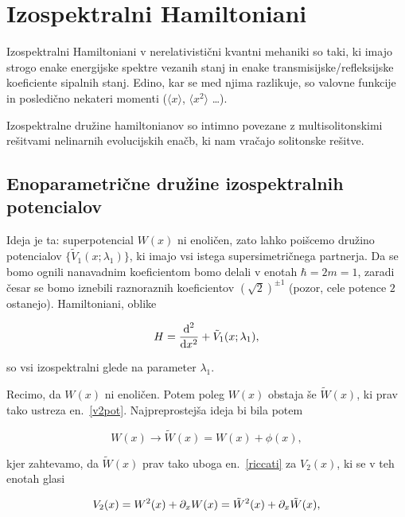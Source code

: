 \section{Izospektralni Hamiltoniani}

Izospektralni Hamiltoniani v nerelativisti\v cni kvantni mehaniki so taki, ki imajo strogo enake energijske
spektre vezanih stanj in enake transmisijske/refleksijske koeficiente sipalnih stanj. Edino, kar se
med njima razlikuje, so valovne funkcije in posledi\v cno nekateri momenti ($\langle x \rangle$, $\langle
x^2 \rangle$ \ldots).

Izospektralne dru\v zine hamiltonianov so intimno povezane z multisolitonskimi re\v sitvami nelinarnih
evolucijskih ena\v cb, ki nam vra\v cajo solitonske re\v sitve.

\subsection{Enoparametri\v cne dru\v zine izospektralnih potencialov}

Ideja je ta: superpotencial $W(x)$ ni enoli\v cen, zato lahko poi\v scemo dru\v zino potencialov
$\{\tilde{V}_1(x;\lambda_1)\}$, ki imajo vsi istega supersimetri\v cnega partnerja. Da se bomo ognili
nanavadnim koeficientom bomo delali v enotah $\hbar = 2m = 1$, zaradi \v cesar se bomo iznebili raznoraznih
koeficientov $(\sqrt{2})^{\pm 1}$ (pozor, cele potence $2$ ostanejo). Hamiltoniani, oblike

\begin{equation}
	H = \frac{\text{d}^2}{\text{d} x^2} + \tilde{V}_1 (x;\lambda_1),
\end{equation}

\ni so vsi izospektralni glede na parameter $\lambda_1$.

Recimo, da $W(x)$ ni enoli\v cen. Potem poleg $W(x)$ obstaja \v se $\tilde{W}(x)$, ki prav tako ustreza
en.~\eqref{v2pot}. Najpreprostej\v sa ideja bi bila potem

\begin{equation}
	W(x) \to \tilde{W}(x) = W(x) + \phi(x),
\end{equation}

\ni kjer zahtevamo, da $\tilde{W}(x)$ prav tako uboga en.~\eqref{riccati} za $V_2(x)$, ki se v teh enotah
glasi

\begin{equation}
	V_2 (x) = W^2(x) + \partial_x W(x) = \tilde{W}^2(x) + \partial_x\tilde{W}(x),
\end{equation}

